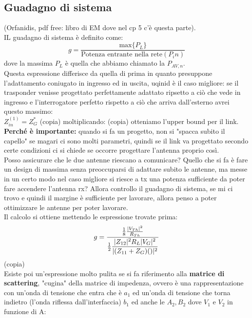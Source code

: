 \documentclass[oneside, 12pt]{extbook}
\DeclarePairedDelimiter{\abs}{\lvert}{\rvert}
\begin{document}
\subsection{Guadagno di sistema}
(Orfanidis, pdf free: libro di EM dove nel cp 5 c'è questa parte).\\IL guadagno di sistema è definito come:
\begin{equation}
	g = \dfrac{\text{max}\{P_L\}}{\text{Potenza entrante nella rete} (P_in)}
\end{equation}
dove la massima $P_L$ è quella che abbiamo chiamato la $P_{AV,n}$.\\Questa espressione differisce da quella di prima in quanto presuppone l'adattamento coniugato in ingresso ed in uscita, uqinid è il caso migliore: se il trasponder venisse progettato perfettamente adattato ripsetto a ciò che vede in ingresso e l'interrogatore perfetto rispetto a ciò che arriva dall'esterno avrei questo massimo:\\
$Z_{in}^{(1)} = Z_{G}^*$ (copia)
moltiplicando: (copia) otteniamo l'upper bound per il link.\\ \textbf{Perché è importante:} quando si fa un progetto, non si "spacca subito il capello" se magari ci sono molti parametri, quindi se il link va progettato secondo certe condizioni ci si chiede se occorre progettare l'antenna proprio così.\\Posso assicurare che le due antenne riescano a comunicare? Quello che si fa è fare un design di massima senza preoccuparsi di adattare subito le antenne, ma messe in un certo modo nel caso migliore si riesce a tx una potenza sufficiente da poter fare accendere l'antenna rx? Allora controllo il guadagno di sistema, se mi ci trovo e quindi il margine è sufficiente per lavorare, allora penso a poter ottimizzare le antenne per poter lavorare.\\Il calcolo si ottiene mettendo le espressione trovate prima:
\begin{equation}
	g = \dfrac{\frac{1}{8}\frac{\abs{V_{Th}}^2}{R_{Th}}}{\frac{1}{2} \dfrac{\abs{Z_{12}}^2 R_L \abs{V_G}^2}{\abs{(Z_{11}+Z_G)()}^2}}
\end{equation}
(copia)\\Esiste poi un'espressione molto pulita se si fa riferimento alla \textbf{matrice di scattering}, "cugina" della matrice di impedenza, ovvero è una rappresentazione con un'onda di tensione che entra che è $a_1$ ed un'onda di tensione che torna indietro (l'onda riflessa dall'interfaccia) $b_1$ ed anche le $A_2, B_2$ dove $V_1$ e $V_2$ in funzione di A:
\end{document}
